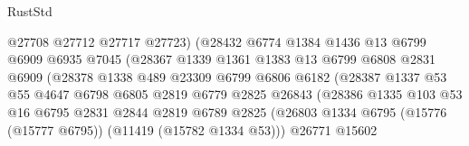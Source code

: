 \begin{lexlean}{RustStd}
\begin{coremodule}
                                  @27708
                                  @27712
                                  @27717
                                  @27723)
                                (@28432
                                  @6774
                                  @1384
                                  @1436
                                  @13
                                  @6799
                                  @6909
                                  @6935
                                  @7045
                                  (@28367
                                    @1339
                                    @1361
                                    @1383
                                    @13
                                    @6799
                                    @6808
                                    @2831
                                    @6909
                                    (@28378
                                      @1338
                                      @489
                                      @23309
                                      @6799
                                      @6806
                                      @6182
                                      (@28387
                                        @1337
                                        @53
                                        @55
                                        @4647
                                        @6798
                                        @6805
                                        @2819
                                        @6779
                                        @2825
                                        @26843
                                        (@28386
                                          @1335
                                          @103
                                          @53
                                          @16
                                          @6795
                                          @2831
                                          @2844
                                          @2819
                                          @6789
                                          @2825
                                          (@26803
                                            @1334
                                            @6795
                                            (@15776 (@15777 @6795))
                                            (@11419 (@15782 @1334 @53)))
                                          @26771
                                          @15602

\end{coremodule}
\end{lexlean}
